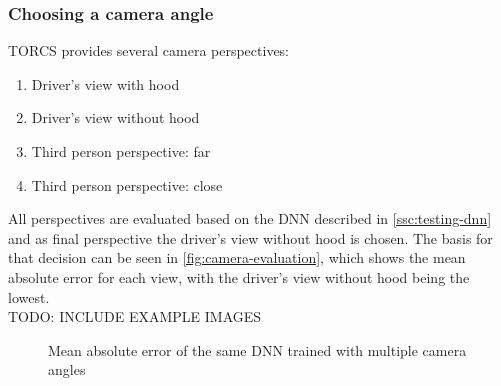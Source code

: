 \documentclass[10pt,a4paper,twoside,journal]{IEEEtran}
\begin{document}
\subsubsection{Choosing a camera angle}
TORCS provides several camera perspectives: 
\begin{enumerate}
	\item Driver's view with hood
	\item Driver's view without hood
	\item Third person perspective: far
	\item Third person perspective: close
\end{enumerate}
All perspectives are evaluated based on the DNN described in \autoref{ssc:testing-dnn} 
and as final perspective the driver's view without hood is chosen. The basis for that decision can be seen in 
\autoref{fig:camera-evaluation}, which shows the mean absolute error for each view, with the driver's view without hood being the lowest.\\
TODO: INCLUDE EXAMPLE IMAGES
\begin{figure}[ht]
	\centering
	\fbox{\rule{0pt}{2cm} \rule{1.0\linewidth}{0pt}}
	\caption{Mean absolute error of the same DNN trained with multiple camera angles}
	\label{fig:camera-evaluation}
\end{figure}
\end{document}
